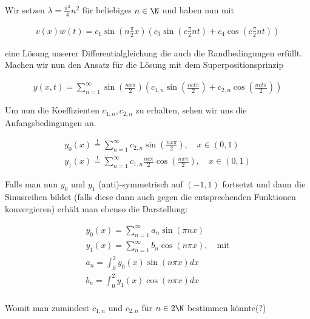 \begin{solution}
Wir setzen $\lambda = \frac{\pi^2}{4}n^2$ für beliebiges $n \in \N$ und haben nun mit

\begin{align*}
  v(x)w(t)
  =
  c_1\sin\left(n\frac{\pi}{2} x\right)
  \left(c_3 \sin\left(c\frac{\pi}{2}nt\right) +
  c_4 \cos\left(c\frac{\pi}{2}nt\right)\right)
\end{align*}

eine Lösung unserer Differentialgleichung die auch die Randbedingungen erfüllt.
Machen wir nun den Ansatz für die Lösung mit dem Superpositionsprinzip

\begin{align*}
  y(x,t)
  =
  \sum_{n=1}^{\infty} \sin\left(\frac{nx\pi}{2}\right)
  \left(c_{1,n}\sin\left(\frac{nct\pi}{2}\right)+c_{2,n}\cos\left(\frac{nct\pi}{2}\right)\right)
\end{align*}

Um nun die Koeffizienten $c_{1,n},c_{2,n}$ zu erhalten, sehen wir uns die
Anfangsbedingungen an.

\begin{align*}
  y_0(x)
  \stackrel{!}{=}
  \sum_{n=1}^\infty c_{2,n}\sin\left(\frac{nx\pi}{2}\right),       \quad x \in (0,1) \\
  y_1(x)
  \stackrel{!}{=}
  \sum_{n=1}^\infty c_{1,n}\frac{nc\pi}{2}\cos\left(\frac{nx\pi}{2}\right),  \quad x \in (0,1)
\end{align*}

Falls man nun $y_0$ und $y_1$ (anti)-symmetrisch auf $(-1,1)$
fortsetzt und dann die Sinusreihen bildet (falls diese dann auch gegen die entsprechenden Funktionen
konvergieren) erhält man ebenso die Darstellung:

\begin{align*}
  y_0(x)
  =
  \sum_{n=1}^\infty a_n \sin(\pi nx) \\
  y_1(x)
  =
  \sum_{n=1}^\infty b_n \cos(n \pi x), \quad \text{mit} \\
  a_n
  =
  \int_0^2 y_0(x)\sin(n\pi x) dx \\
  b_n
  =
  \int_0^2 y_1(x)\cos(n\pi x) dx \\
\end{align*}

Womit man zumindest $c_{1,n}$ und $c_{2,n}$ für $n \in 2\N$ bestimmen könnte(?)

\end{solution}
